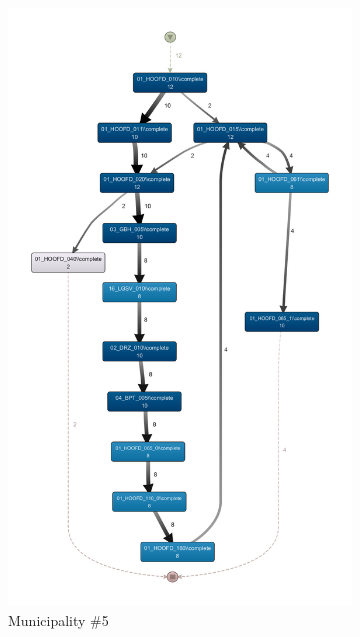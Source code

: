 \begin{figure}
\begin{subfigure}{.2\textwidth}
    \centering
        \includegraphics[width=.8\linewidth]{5_results_discussions/coselog-wabo/coselog-wabo-4-simplified}
    \caption{Municipality \#5}
    \label{fig:coselog-wabo-process-models-simplified-4}
  \end{subfigure}
    \begin{subfigure}{.2\textwidth}
    \centering

\end{subfigure}
\end{figure}
